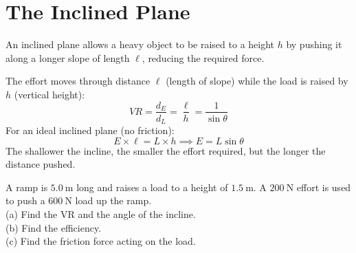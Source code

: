 \section{The Inclined Plane}

\begin{processbox}
An inclined plane allows a heavy object to be raised
to a height $h$ by pushing it along a longer slope
of length $\ell$, reducing the required force.

\begin{center}
\end{center}

The effort moves through distance $\ell$ (length of
slope) while the load is raised by $h$ (vertical height):
\[
  VR = \frac{d_E}{d_L} = \frac{\ell}{h}
  = \frac{1}{\sin\theta}
\]
For an ideal inclined plane (no friction):
\[
  E \times \ell = L \times h
  \implies E = L\sin\theta
\]
The shallower the incline, the smaller the effort
required, but the longer the distance pushed.
\end{processbox}

\begin{examplebox}[10.3]
A ramp is $5.0\ \text{m}$ long and raises a load
to a height of $1.5\ \text{m}$.
A $200\ \text{N}$ effort is used to push a
$600\ \text{N}$ load up the ramp.\\
(a) Find the VR and the angle of the incline.\\
(b) Find the efficiency.\\
(c) Find the friction force acting on the load.
\end{examplebox}

